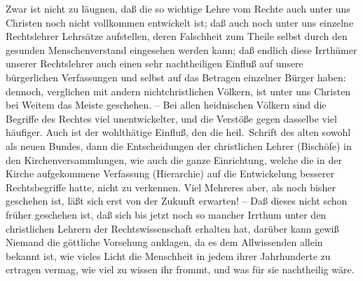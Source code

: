 Zwar ist nicht zu läugnen, daß die so wichtige Lehre vom Rechte auch unter uns Christen noch nicht vollkommen entwickelt ist; daß auch noch unter uns einzelne Rechtslehrer Lehrsätze aufstellen, deren Falschheit zum Theile selbst durch den gesunden Menschenverstand eingesehen werden kann; daß endlich diese Irrthümer unserer Rechtslehrer auch einen sehr nachtheiligen Einfluß auf unsere bürgerlichen Verfassungen und selbst auf das Betragen einzelner Bürger haben: dennoch, verglichen mit andern nichtchristlichen Völkern, ist unter uns Christen bei Weitem das Meiste geschehen. -- Bei allen heidnischen Völkern sind die Begriffe des Rechtes viel unentwickelter, und die Verstöße gegen dasselbe viel häufiger. Auch ist der wohlthätige Einfluß, den die heil.\ Schrift des alten sowohl als neuen Bundes, dann die Entscheidungen der christlichen Lehrer (Bischöfe) in den Kirchenversammlungen, wie auch die ganze Einrichtung, welche die in der Kirche aufgekommene Verfassung (Hierarchie) auf die Entwickelung besserer Rechtsbegriffe hatte, nicht zu verkennen. Viel Mehreres aber, als noch bisher geschehen ist, läßt sich erst von der Zukunft erwarten! -- Daß dieses nicht schon früher geschehen ist, daß sich bis jetzt noch so mancher Irrthum unter den christlichen Lehrern der Rechtswissenschaft erhalten hat, darüber kann gewiß Niemand die göttliche Vorsehung anklagen, da es dem Allwissenden allein bekannt ist, wie vieles Licht die Menschheit in jedem ihrer Jahrhunderte zu ertragen vermag, wie viel zu wissen ihr frommt, und was für sie nachtheilig wäre.


